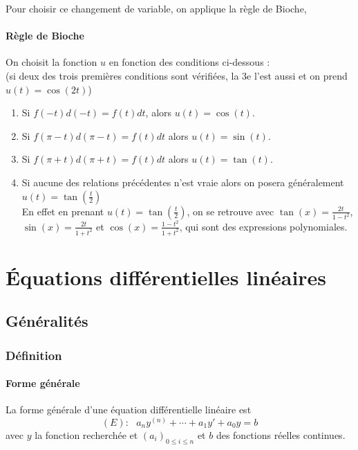 \documentclass[a4paper,10pt]{book} %
\begin{document}
Pour choisir ce changement de variable, on applique la règle de Bioche, 

\subsubsection{Règle de Bioche}
On choisit la fonction $u$ en fonction des conditions ci-dessous :\\
(si deux des trois premières conditions sont vérifiées, la 3e l'est aussi et on prend $u(t)=\cos(2t)$)


\begin{enumerate}
\item Si $f(-t)d(-t)=f(t)dt$, alors $u(t)=\cos(t)$.
\item Si $f(\pi-t)d(\pi-t)=f(t)dt$ alors $u(t)=\sin(t)$.
\item Si $f(\pi+t)d(\pi+t)=f(t)dt$ alors $u(t)=\tan(t)$.
\item Si aucune des relations précédentes n'est vraie alors on posera généralement $u(t)=\tan(\frac{t}{2})$\\

En effet en prenant $u(t)=\tan(\frac{t}{2})$, on se retrouve avec $\tan(x)=\frac{2t}{1-t^2}$, $\sin(x)=\frac{2t}{1+t^2}$ et $\cos(x)=\frac{1-t^2}{1+t^2}$, qui sont des expressions polynomiales.
\end{enumerate}







\chapter{Équations différentielles linéaires}
\section{Généralités}
\subsection{Définition}
\subsubsection{Forme générale}
La forme générale d'une équation différentielle linéaire est 
$$(E):\text{ } a_ny^{(n)}+\cdots+a_1y'+a_0y=b$$
avec $y$ la fonction recherchée et $(a_i)_{0\leq i\leq n}$ et $b$ des fonctions réelles continues.
\end{document}
